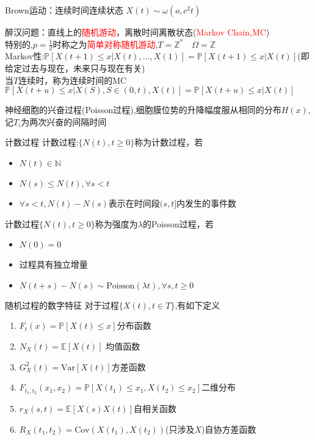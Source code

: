 \documentclass{elegantbook}
\newcommand\var{\text{Var}}
\newcommand\cov{\text{Cov}}
\newcommand\p{\mathbb{P}}
\newcommand\E{\mathbb{E}}
\begin{document}
\begin{example}
    Brown运动：连续时间连续状态 $X(t)\sim \omega(o,c^2t)$
\end{example}
\begin{example}
    醉汉问题：直线上的\textcolor{red}{随机游动}，离散时间离散状态(\textcolor{red}{Markov Chain,MC})
    \\ 特别的,$p=\frac{1}{2}$时称之为\textcolor{red}{简单对称随机游动},$T=\mathbb{Z}^*\quad \Omega =\mathbb{Z}$
    \\ Markov性:$\p [X(t+1)\leq x|X(t),\dots ,X(1)]=\p [X(t+1)\leq x|X(t)]$(即给定过去与现在，未来只与现在有关)
    \\ 当$T$连续时，称为连续时间的MC\quad $\p [X(t+u)\leq x|X(S),S\in (0,t),X(t)]=\p [X(t+u)\leq x|X(t)]$
\end{example}
\begin{example}
    神经细胞的兴奋过程(Poisson过程),细胞膜位势的升降幅度服从相同的分布$H(x)$,记$T_i$为两次兴奋的间隔时间
\end{example}
\begin{definition}{计数过程}{}
    计数过程:$\{N(t),t\geq 0\}$称为计数过程，若
    \begin{itemize}
        \item $N(t)\in \mathbb{N}$
        \item $N(s)\leq N(t), \forall s<t$
        \item $\forall s<t,N(t)-N(s)$表示在时间段$(s,t]$内发生的事件数
    \end{itemize}
    计数过程$\{N(t),t\geq 0\}$称为强度为$\lambda$的Poisson过程，若
    \begin{itemize}
        \item $N(0)=0$
        \item 过程具有独立增量
        \item $N(t+s)-N(s)\sim \text{Poisson}(\lambda t),\forall s,t\geq 0$
    \end{itemize}
\end{definition}

\begin{definition}{随机过程的数字特征}{}
    对于过程$\{X(t),t\in T\}$,有如下定义
    \begin{enumerate}
        \item $F_t(x)=\p [X(t)\leq x]$\quad 分布函数
        \item $N_X(t)=\E [X(t)]$ 均值函数
        \item $G_X^2(t)=\var [X(t)]$\quad 方差函数
        \item $F_{t_1,t_2}(x_1,x_2)=\p [X(t_1)\leq x_1,X(t_2)\leq x_2]$\quad 二维分布
        \item $r_X(s,t)=\E [X(s)X(t)]$自相关函数
        \item $R_X(t_1,t_2)=\cov (X(t_1),X(t_2))$(只涉及$X$)自协方差函数
    \end{enumerate}
\end{definition}
\end{document}
